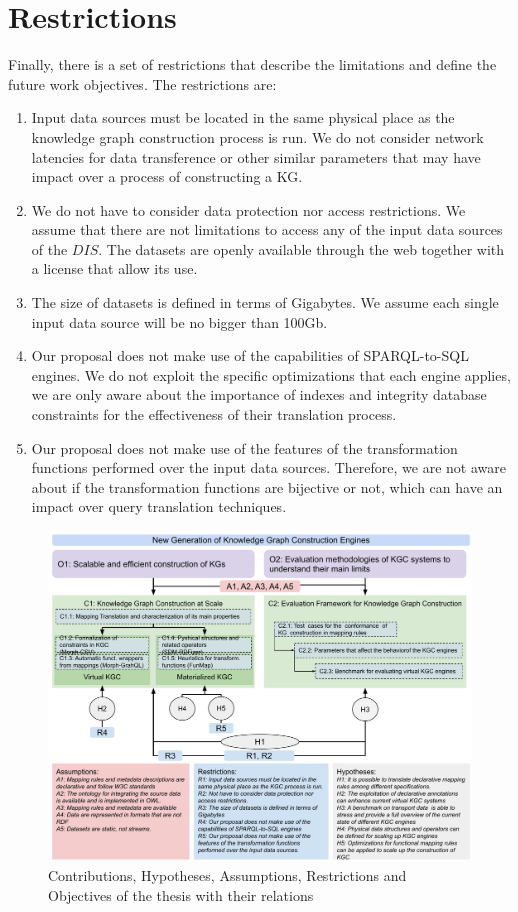 \section{Restrictions}
Finally, there is a set of restrictions that describe the limitations and define the future work objectives. The restrictions are:

\begin{enumerate}[label=\textbf{R{\arabic*}}]
    \item Input data sources must be located in the same physical place as the knowledge graph construction process is run. We do not consider network latencies for data transference or other similar parameters that may have impact over a process of constructing a KG. 
     \item We do not have to consider data protection nor access restrictions. We assume that there are not limitations to access any of the input data sources of the $DIS$. The datasets are openly available through the web together with a license that allow its use.
    \item The size of datasets is defined in terms of Gigabytes. We assume each single input data source will be no bigger than 100Gb.
    \item Our proposal does not make use of the capabilities of SPARQL-to-SQL engines. We do not exploit the specific optimizations that each engine applies, we are only aware about the importance of indexes and integrity database constraints for the effectiveness of their translation process.
    \item Our proposal does not make use of the features of the transformation functions performed over the input data sources. Therefore, we are not aware about if the transformation functions are bijective or not, which can have an impact over query translation techniques.  
\end{enumerate}



\begin{figure}[!t]
\centering
\includegraphics[angle=90,width=1\textwidth]{figures/summarize contributions.pdf}
\caption[Relations of the contributions of the thesis]{Contributions, Hypotheses, Assumptions, Restrictions and Objectives of the thesis with their relations}
\label{fig:objectives_contributiobs}
\end{figure}